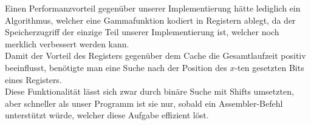 \documentclass[course=erap]{aspdoc}
\begin{document}
	\noindent Einen Performanzvorteil gegenüber unserer Implementierung hätte lediglich ein Algorithmus, welcher eine Gammafunktion kodiert in Registern ablegt, da der Speicherzugriff der einzige Teil unserer Implementierung ist, welcher noch merklich verbessert werden kann.\\
	Damit der Vorteil des Registers gegenüber dem Cache die Gesamtlaufzeit positiv beeinflusst, benötigte man eine Suche nach der Position des $x$-ten gesetzten Bits eines Registers.\\
	Diese Funktionalität lässt sich zwar durch binäre Suche mit Shifts umsetzten, aber schneller als unser Programm ist sie nur, sobald ein Assembler-Befehl unterstützt würde, welcher diese Aufgabe effizient löst.

	
	{}
\end{document}
